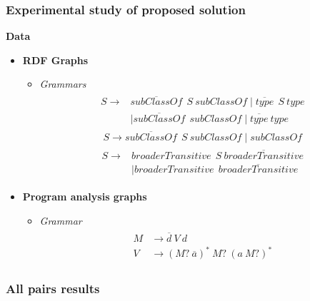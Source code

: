 \documentclass{beamer}
\begin{document}
  \begin{frame}
\transwipe[direction=90]
 \frametitle{Experimental study of proposed solution}
 \textbf{Data}
 \begin{itemize}
     \item \textbf{RDF Graphs}
     \begin{itemize}
         \item \textit{Grammars}
  \begin{align}
\begin{split}
\label{eqn:g_1}
S \to & \overline{\textit{subClassOf}} \ \ S \ \textit{subClassOf} \mid \overline{\textit{type}} \ \ S \ \textit{type}\\   & \mid \overline{\textit{subClassOf}} \ \ \textit{subClassOf} \mid \overline{\textit{type}} \ \textit{type}
\end{split}
\end{align}
\begin{align}
\label{eqn:g_2}
S \to \overline{\textit{subClassOf}} \ \ S \ \textit{subClassOf} \mid \textit{subClassOf}
\end{align}
\begin{align}
\begin{split}
\label{eqn:geo}
S \to & \textit{broaderTransitive} \ \  S \ \overline{\textit{broaderTransitive}} \\
      & \mid \textit{broaderTransitive} \ \  \overline{\textit{broaderTransitive}}
\end{split}
\end{align}
     \end{itemize}
     \item \textbf{Program analysis graphs}
     \begin{itemize}
         \item 
         \textit{Grammar}
         \begin{align}
\begin{split}
\label{eqn:points_to}
M & \to \overline{d} \ V \ d \\
V & \to (M? \ \overline{a})^* \ M? \ (a \ M?)^* 
\end{split}
\end{align}
     \end{itemize}
 \end{itemize}
 \end{frame}
 
 \begin{frame}
\transwipe[direction=90]
 \frametitle{All pairs results}
  \begin{figure}[H]
\centering
{}
\label{fig:nums}
\end{figure}

 \begin{figure}[H]
\centering
{}
\label{fig:arch}
\end{figure}
\end{frame}
\end{document}
